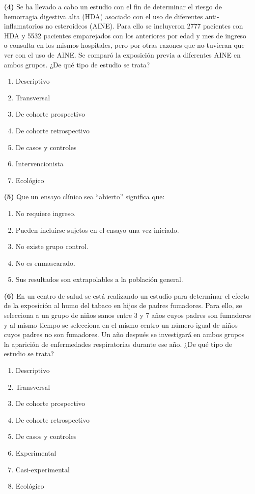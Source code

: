 \documentclass[
]{book}
\providecommand{\tightlist}{%
  \setlength{\itemsep}{0pt}\setlength{\parskip}{0pt}}
\theoremstyle{definition}
\theoremstyle{definition}
\theoremstyle{definition}
\theoremstyle{definition}
\theoremstyle{remark}
\begin{document}
\textbf{(4)} Se ha llevado a cabo un estudio con el fin de determinar el riesgo de hemorragia digestiva alta (HDA) asociado con el uso de diferentes anti-inflamatorios no esteroideos (AINE). Para ello se incluyeron 2777 pacientes con HDA y 5532 pacientes emparejados con los anteriores por edad y mes de ingreso o consulta en los mismos hospitales, pero por otras razones que no tuvieran que ver con el uso de AINE. Se comparó la exposición previa a diferentes AINE en ambos grupos. ¿De qué tipo de estudio se trata?

\begin{enumerate}
\def\labelenumi{\arabic{enumi}.}
\tightlist
\item
  Descriptivo
\item
  Transversal
\item
  De cohorte prospectivo
\item
  De cohorte retrospectivo
\item
  De casos y controles
\item
  Intervencionista
\item
  Ecológico
\end{enumerate}

\textbf{(5)} Que un ensayo clínico sea ``abierto'' significa que:

\begin{enumerate}
\def\labelenumi{\arabic{enumi}.}
\tightlist
\item
  No requiere ingreso.
\item
  Pueden incluirse sujetos en el ensayo una vez iniciado.
\item
  No existe grupo control.
\item
  No es enmascarado.
\item
  Sus resultados son extrapolables a la población general.
\end{enumerate}

\textbf{(6)} En un centro de salud se está realizando un estudio para determinar el efecto de la exposición al humo del tabaco en hijos de padres fumadores. Para ello, se selecciona a un grupo de niños sanos entre 3 y 7 años cuyos padres son fumadores y al mismo tiempo se selecciona en el mismo centro un número igual de niños cuyos padres no son fumadores. Un año después se investigará en ambos grupos la aparición de enfermedades respiratorias durante ese año. ¿De qué tipo de estudio se trata?

\begin{enumerate}
\def\labelenumi{\arabic{enumi}.}
\tightlist
\item
  Descriptivo
\item
  Transversal
\item
  De cohorte prospectivo
\item
  De cohorte retrospectivo
\item
  De casos y controles
\item
  Experimental
\item
  Casi-experimental
\item
  Ecológico
\end{enumerate}
\end{document}
